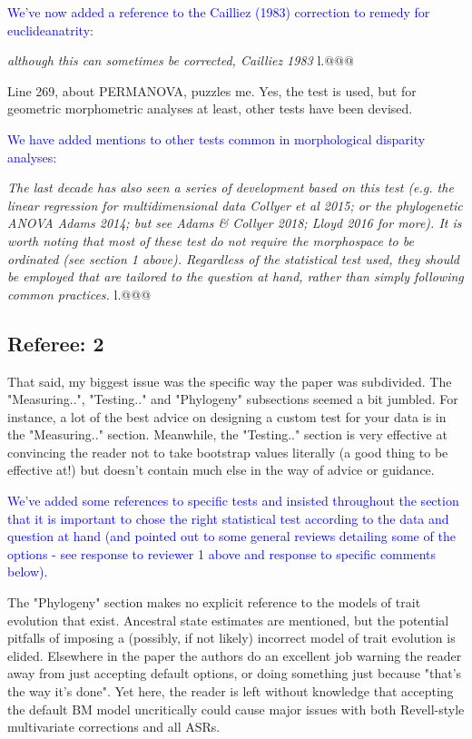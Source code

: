 \documentclass[12pt,letterpaper]{article}
\begin{document}
\textcolor{blue}{We've now added a reference to the Cailliez (1983) correction to remedy for euclideanatrity}:

\textit{although this can sometimes be corrected, Cailliez 1983} l.@@@

\noindent Line 269, about PERMANOVA, puzzles me. Yes, the test is used, but for geometric morphometric analyses at least, other tests have been devised.

\textcolor{blue}{We have added mentions to other tests common in morphological disparity analyses:}

\textit{The last decade has also seen a series of development based on this test (e.g. the linear regression for multidimensional data Collyer et al 2015; or the phylogenetic ANOVA Adams 2014; but see Adams \& Collyer 2018; Lloyd 2016 for more).
It is worth noting that most of these test do not require the morphospace to be ordinated (see section 1 above).
Regardless of the statistical test used, they should be employed that are tailored to the question at hand, rather than simply following common practices.} l.@@@

\subsection{Referee: 2}

\noindent That said, my biggest issue was the specific way the paper was subdivided. The "Measuring..", "Testing.." and "Phylogeny" subsections seemed a bit jumbled. For instance, a lot of the best advice on designing a custom test for your data is in the "Measuring.." section. Meanwhile, the "Testing.." section is very effective at convincing the reader not to take bootstrap values literally (a good thing to be effective at!) but doesn't contain much else in the way of advice or guidance.

\textcolor{blue}{We've added some references to specific tests and insisted throughout the section that it is important to chose the right statistical test according to the data and question at hand (and pointed out to some general reviews detailing some of the options - see response to reviewer 1 above and response to specific comments below).}

\noindent The "Phylogeny" section makes no explicit reference to the models of trait evolution that exist. Ancestral state estimates are mentioned, but the potential pitfalls of imposing a (possibly, if not likely) incorrect model of trait evolution is elided. Elsewhere in the paper the authors do an excellent job warning the reader away from just accepting default options, or doing something just because "that's the way it's done". Yet here, the reader is left without knowledge that accepting the default BM model uncritically could cause major issues with both Revell-style multivariate corrections and all ASRs.
\end{document}
